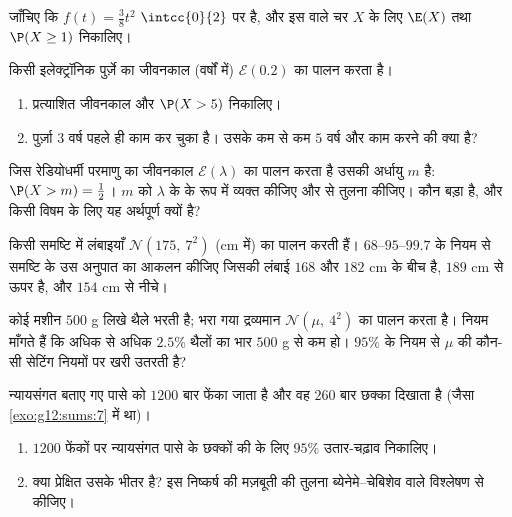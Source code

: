 \begin{exercise}[$\star$]\label{exo:g12:contdist:2}
जाँचिए कि $f(t) = \frac{3}{8}t^2$ $\intcc{0}{2}$ पर  है, और इस  वाले चर $X$ के लिए $\E(X)$
तथा $\P(X \geq 1)$ निकालिए।
\end{exercise}

\begin{exercise}[$\star$]\label{exo:g12:contdist:3}
किसी इलेक्ट्रॉनिक पुर्ज़े का जीवनकाल (वर्षों में) $\mathcal E(0.2)$ का पालन करता है।
\begin{enumerate}
  \item प्रत्याशित जीवनकाल और $\P(X > 5)$ निकालिए।
  \item पुर्ज़ा $3$ वर्ष पहले ही काम कर चुका है। उसके कम से कम $5$ वर्ष
        और काम करने की  क्या है?
\end{enumerate}
\end{exercise}

\begin{exercise}[$\star\star$]\label{exo:g12:contdist:4}
जिस रेडियोधर्मी परमाणु का जीवनकाल $\mathcal E(\lambda)$ का पालन करता है उसकी अर्धायु 
$m$ है: $\P(X > m) = \frac12$। $m$ को $\lambda$ के  के रूप में व्यक्त कीजिए और 
से तुलना कीजिए। कौन बड़ा है, और किसी विषम  के लिए यह अर्थपूर्ण क्यों है?
\end{exercise}

\begin{exercise}[$\star\star$]\label{exo:g12:contdist:5}
किसी समष्टि में लंबाइयाँ $\mathcal N(175,\ 7^2)$ (cm में) का पालन करती हैं।
$68$--$95$--$99.7$ के नियम से समष्टि के उस अनुपात का आकलन कीजिए जिसकी लंबाई
$168$ और $182$ cm के बीच है, $189$ cm से ऊपर है, और $154$ cm से नीचे।
\end{exercise}

\begin{exercise}[$\star\star$]\label{exo:g12:contdist:6}
कोई मशीन $500$ g लिखे थैले भरती है; भरा गया द्रव्यमान $\mathcal N(\mu,\ 4^2)$ का पालन करता है।
नियम माँगते हैं कि अधिक से अधिक $2.5\%$ थैलों का भार $500$ g से कम हो। $95\%$ के
नियम से $\mu$ की कौन-सी  सेटिंग नियमों पर खरी उतरती है?
\end{exercise}

\begin{exercise}[$\star\star$]\label{exo:g12:contdist:7}
न्यायसंगत बताए गए पासे को $1200$ बार फेंका जाता है और वह $260$ बार छक्का दिखाता
है (जैसा \cref{exo:g12:sums:7} में था)।
\begin{enumerate}
  \item $1200$ फेंकों पर न्यायसंगत पासे के छक्कों की  के लिए
        $95\%$ उतार-चढ़ाव  निकालिए।
  \item क्या प्रेक्षित  उसके भीतर है? इस निष्कर्ष की
        मज़बूती की तुलना ब्येनेमे--चेबिशेव वाले विश्लेषण से कीजिए।
\end{enumerate}
\end{exercise}

